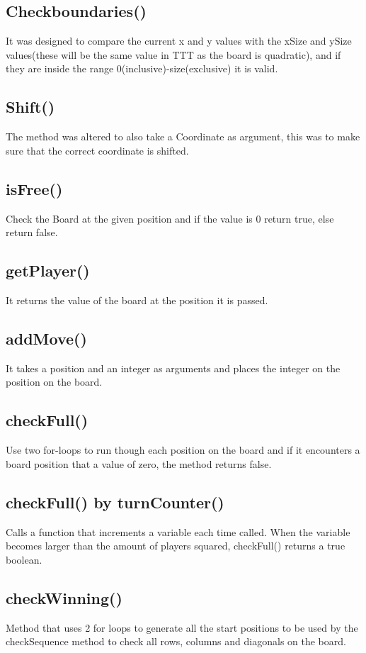 \documentclass[a4paper,10pt]{article}
\begin{document}
	\subsection{Checkboundaries()}
	It was designed to compare the current x and y values with the xSize and ySize values(these will be the same value in TTT as the board is quadratic), and if they are inside the range 0(inclusive)-size(exclusive) it is valid.
	\subsection{Shift()}
	The method was altered to also take a Coordinate as argument, this was to make sure that the correct coordinate is shifted.
	\subsection{isFree()}
	Check the Board at the given position and if the value is 0 return true, else return false.
	\subsection{getPlayer()}
	It returns the value of the board at the position it is passed.
	\subsection{addMove()}
	It takes a position and an integer as arguments and places the integer on the position on the board.
	\subsection{checkFull()}
	Use two for-loops to run though each position on the board and if it encounters a board position that a value of zero, the method returns false.
	
	\subsection{checkFull() by turnCounter()}
	Calls a function that increments a variable each time called. When the variable becomes larger than the amount of players squared, checkFull() returns a true boolean.
	
	\subsection{checkWinning()}
	Method that uses 2 for loops to generate all the start positions to be used by the checkSequence method to check all rows, columns and diagonals on the board. 
\end{document}
